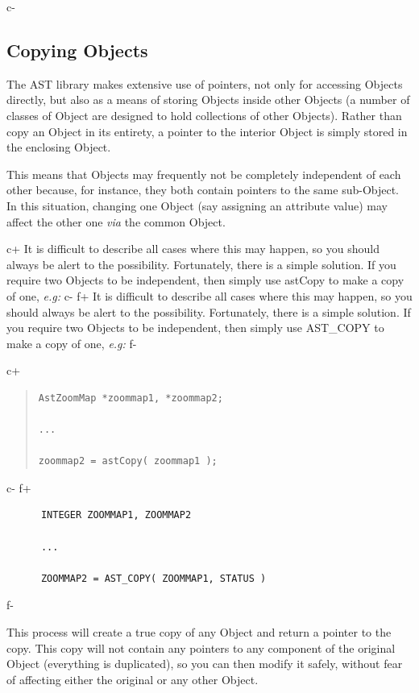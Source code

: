 \documentclass[twoside,11pt]{article}
\begin{document}
c-


\subsection{\label{ss:copyingobjects}Copying Objects}

The AST library makes extensive use of pointers, not only for
accessing Objects directly, but also as a means of storing Objects
inside other Objects (a number of classes of Object are designed to
hold collections of other Objects). Rather than copy an Object in its
entirety, a pointer to the interior Object is simply stored in the
enclosing Object.

This means that Objects may frequently not be completely independent
of each other because, for instance, they both contain pointers to the
same sub-Object. In this situation, changing one Object (say assigning
an attribute value) may affect the other one {\em{via}} the common
Object.

c+
It is difficult to describe all cases where this may happen, so you
should always be alert to the possibility. Fortunately, there is a
simple solution. If you require two Objects to be independent, then
simply use astCopy to make a copy of one, {\em{e.g:}}
c-
f+
It is difficult to describe all cases where this may happen, so you
should always be alert to the possibility. Fortunately, there is a
simple solution. If you require two Objects to be independent, then
simply use AST\_COPY to make a copy of one, {\em{e.g:}}
f-

c+
\begin{quote}
\small
\begin{verbatim}
AstZoomMap *zoommap1, *zoommap2;

...

zoommap2 = astCopy( zoommap1 );
\end{verbatim}
\normalsize
\end{quote}
c-
f+
\small
\begin{verbatim}
      INTEGER ZOOMMAP1, ZOOMMAP2

      ...

      ZOOMMAP2 = AST_COPY( ZOOMMAP1, STATUS )
\end{verbatim}
\normalsize
f-

This process will create a true copy of any Object and return a
pointer to the copy. This copy will not contain any pointers to any
component of the original Object (everything is duplicated), so you
can then modify it safely, without fear of affecting either the
original or any other Object.
\end{document}
